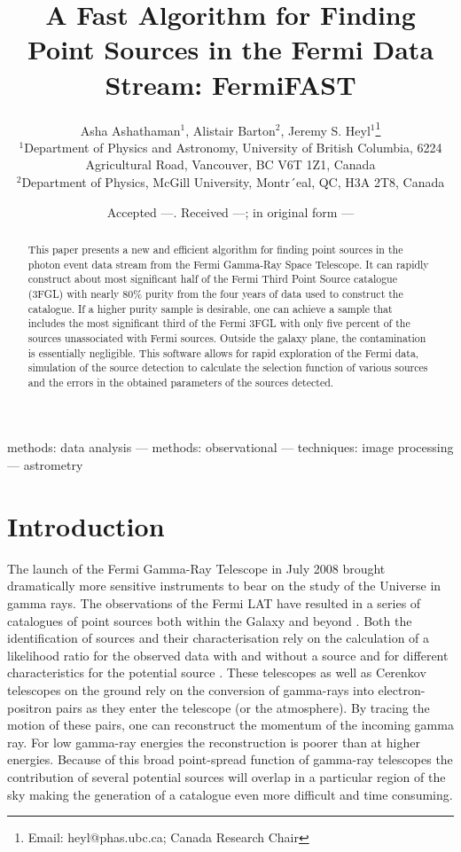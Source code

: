 \documentclass[useAMS,usenatbib]{mn2e}
\title[FermiFAST]{A Fast Algorithm for Finding Point Sources
in the Fermi Data Stream: FermiFAST}
\author[A. Ashathaman, A. Barton and J. S. Heyl]{Asha Ashathaman$^{1}$, Alistair Barton$^{2}$,
  Jeremy S. Heyl$^{1}$\thanks{Email: heyl@phas.ubc.ca; Canada Research Chair} \\
$^{1}$Department of Physics and Astronomy, University of British
  Columbia, 6224 Agricultural Road, Vancouver, BC V6T 1Z1, Canada\\
$^{2}$Department of Physics, McGill University, Montr´eal, QC, H3A 2T8, Canada}
\begin{document}
\date{Accepted ---. Received ---; in original form ---}

\pagerange{\pageref{firstpage}--\pageref{lastpage}} 

\maketitle

\label{firstpage}

\begin{abstract}
  This paper presents a new and efficient algorithm for finding point
  sources in the photon event data stream from the Fermi Gamma-Ray
  Space Telescope.  It can rapidly construct about most significant
  half of the Fermi Third Point Source catalogue (3FGL) with nearly
  80\% purity from the four years of data used to construct the
  catalogue.  If a higher purity sample is desirable, one can achieve
  a sample that includes the most significant third of the Fermi 3FGL
  with only five percent of the sources unassociated with Fermi
  sources.  Outside the galaxy plane, the contamination is essentially
  negligible.  This software allows for rapid exploration of the Fermi
  data, simulation of the source detection to calculate the selection
  function of various sources and the errors in the obtained
  parameters of the sources detected.
\end{abstract}

\begin{keywords}
methods: data analysis --- methods: observational --- techniques:
image processing --- astrometry
\end{keywords}

\section{Introduction}

The launch of the Fermi Gamma-Ray Telescope in July 2008 brought
dramatically more sensitive instruments to bear on the study of the
Universe in gamma rays.  The observations of the Fermi LAT
\citep[e.g.][]{2012ApJS..203....4A} have resulted in a series of
catalogues of point sources both within the Galaxy and beyond
\citep[e.g.][]{2010ApJS..188..405A,2011ApJ...743..171A,
  2012ApJS..199...31N,2013ApJS..208...17A,
  2013ApJS..209...34A,2015ApJS..218...23A}.  Both the identification
of sources and their characterisation rely on the calculation of a
likelihood ratio for the observed data with and without a source and
for different characteristics for the potential source
\citep{1979ApJ...228..939C,1992MNRAS.259..413S,1996ApJ...461..396M}.
These telescopes as well as Cerenkov telescopes on the ground rely on
the conversion of gamma-rays into electron-positron pairs as they
enter the telescope (or the atmosphere).  By tracing the motion of
these pairs, one can reconstruct the momentum of the incoming gamma
ray.  For low gamma-ray energies the reconstruction is poorer than at
higher energies.  Because of this broad point-spread
function of gamma-ray telescopes the contribution of several potential
sources will overlap in a particular region of the sky making the
generation of a catalogue even more difficult and time consuming.
\end{document}
